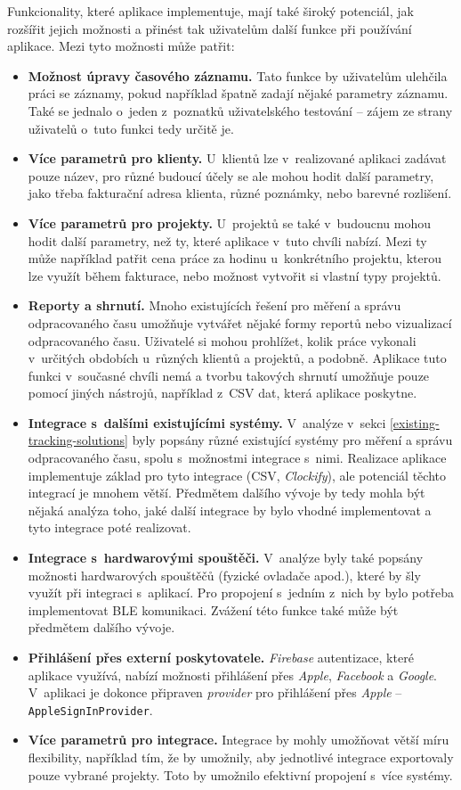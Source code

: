 Funkcionality, které aplikace implementuje, mají také široký potenciál, jak rozšířit jejich možnosti a přinést tak uživatelům další funkce při používání aplikace. Mezi tyto možnosti může patřit:
\begin{itemize}
\item\textbf{Možnost úpravy časového záznamu.} Tato funkce by uživatelům ulehčila práci se záznamy, pokud například špatně zadají nějaké parametry záznamu. Také se jednalo o~jeden z~poznatků uživatelského testování – zájem ze strany uživatelů o~tuto funkci tedy určitě je.
\item\textbf{Více parametrů pro klienty.} U~klientů lze v~realizované aplikaci zadávat pouze název, pro různé budoucí účely se ale mohou hodit další parametry, jako třeba fakturační adresa klienta, různé poznámky, nebo barevné rozlišení.
\item\textbf{Více parametrů pro projekty.} U~projektů se také v~budoucnu mohou hodit další parametry, než ty, které aplikace v~tuto chvíli nabízí. Mezi ty může například patřit cena práce za hodinu u~konkrétního projektu, kterou lze využít během fakturace, nebo možnost vytvořit si vlastní typy projektů. 
\item\textbf{Reporty a shrnutí.} Mnoho existujících řešení pro měření a správu odpracovaného času umožňuje vytvářet nějaké formy reportů nebo vizualizací odpracovaného času. Uživatelé si mohou prohlížet, kolik práce vykonali v~určitých obdobích u~různých klientů a projektů, a podobně. Aplikace tuto funkci v~současné chvíli nemá a tvorbu takových shrnutí umožňuje pouze pomocí jiných nástrojů, například z~CSV dat, která aplikace poskytne.
\item\textbf{Integrace s~dalšími existujícími systémy.} V~analýze v~sekci \ref{existing-tracking-solutions} byly popsány různé existující systémy pro měření a správu odpracovaného času, spolu s~možnostmi integrace s~nimi. Realizace aplikace implementuje základ pro tyto integrace (CSV, \emph{Clockify}), ale potenciál těchto integrací je mnohem větší. Předmětem dalšího vývoje by tedy mohla být nějaká analýza toho, jaké další integrace by bylo vhodné implementovat a tyto integrace poté realizovat.
\item\textbf{Integrace s~hardwarovými spouštěči.} V~analýze byly také popsány možnosti hardwarových spouštěčů (fyzické ovladače apod.), které by šly využít při integraci s~aplikací. Pro propojení s~jedním z~nich by bylo potřeba implementovat BLE komunikaci. Zvážení této funkce také může být předmětem dalšího vývoje.
\item\textbf{Přihlášení přes externí poskytovatele.} \emph{Firebase} autentizace, které aplikace využívá, nabízí možnosti přihlášení přes \emph{Apple}, \emph{Facebook} a \emph{Google}. V~aplikaci je dokonce připraven \emph{provider} pro přihlášení přes \emph{Apple} – \texttt{AppleSignInProvider}.
\item\textbf{Více parametrů pro integrace.} Integrace by mohly umožňovat větší míru flexibility, například tím, že by umožnily, aby jednotlivé integrace exportovaly pouze vybrané projekty. Toto by umožnilo efektivní propojení s~více systémy.
\end{itemize}

